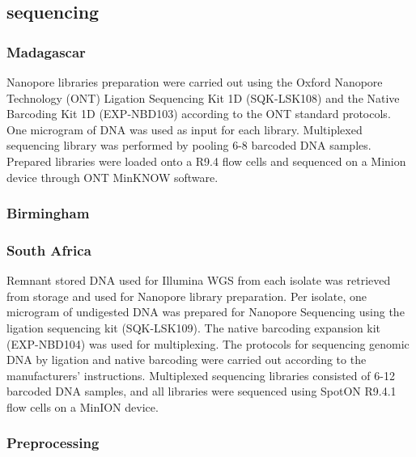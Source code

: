 \subsection{\ont{} sequencing}

\subsubsection{Madagascar}


Nanopore libraries preparation were carried out using the Oxford Nanopore Technology (ONT) Ligation Sequencing Kit 1D (SQK-LSK108) and the Native Barcoding Kit 1D (EXP-NBD103) according to the ONT standard protocols. One microgram of DNA was used as input for each library. Multiplexed sequencing library was performed by pooling 6-8 barcoded DNA samples. Prepared libraries were loaded onto a R9.4 flow cells and sequenced on a Minion device through ONT MinKNOW software.

\subsubsection{Birmingham}


\subsubsection{South Africa}


Remnant stored DNA used for Illumina WGS from each isolate was retrieved from storage and used for Nanopore library preparation. Per isolate, one microgram of undigested DNA was prepared for Nanopore Sequencing using the ligation sequencing kit (SQK-LSK109). The native barcoding expansion kit (EXP-NBD104) was used for multiplexing. The protocols for sequencing genomic DNA by ligation and native barcoding were carried out according to the manufacturers’ instructions. Multiplexed sequencing libraries consisted of 6-12 barcoded DNA samples, and all libraries were sequenced using SpotON R9.4.1 flow cells on a MinION device. 

\subsubsection{Preprocessing}

